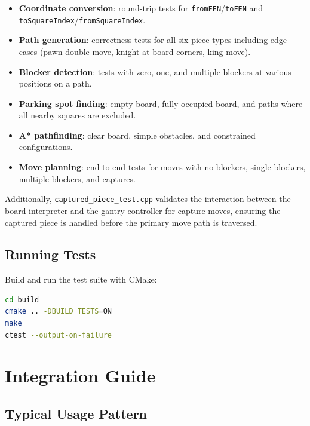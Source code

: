 \documentclass[11pt,a4paper]{report}
\begin{document}
\begin{itemize}
    \item \textbf{Coordinate conversion}: round-trip tests for \texttt{fromFEN}/\texttt{toFEN} and \texttt{toSquareIndex}/\texttt{fromSquareIndex}.
    \item \textbf{Path generation}: correctness tests for all six piece types including edge cases (pawn double move, knight at board corners, king move).
    \item \textbf{Blocker detection}: tests with zero, one, and multiple blockers at various positions on a path.
    \item \textbf{Parking spot finding}: empty board, fully occupied board, and paths where all nearby squares are excluded.
    \item \textbf{A* pathfinding}: clear board, simple obstacles, and constrained configurations.
    \item \textbf{Move planning}: end-to-end tests for moves with no blockers, single blockers, multiple blockers, and captures.
\end{itemize}

Additionally, \texttt{captured\_piece\_test.cpp} validates the interaction between the board interpreter and the gantry controller for capture moves, ensuring the captured piece is handled before the primary move path is traversed.

\section{Running Tests}

Build and run the test suite with CMake:

\begin{lstlisting}[language=bash]
cd build
cmake .. -DBUILD_TESTS=ON
make
ctest --output-on-failure
\end{lstlisting}

\chapter{Integration Guide}

\section{Typical Usage Pattern}
\end{document}
